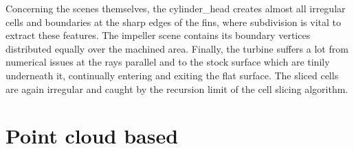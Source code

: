 Concerning the scenes themselves, the cylinder\_head creates almost all irregular cells and boundaries at the sharp edges of the fins, where subdivision is vital to extract these features.
The impeller scene contains its boundary vertices distributed equally over the machined area.
Finally, the turbine suffers a lot from numerical issues at the rays parallel and to the stock surface which are tinily underneath it, continually entering and exiting the flat surface.
The sliced cells are again irregular and caught by the recursion limit of the cell slicing algorithm.


\section{Point cloud based}
\label{sec:point_cloud_results}

